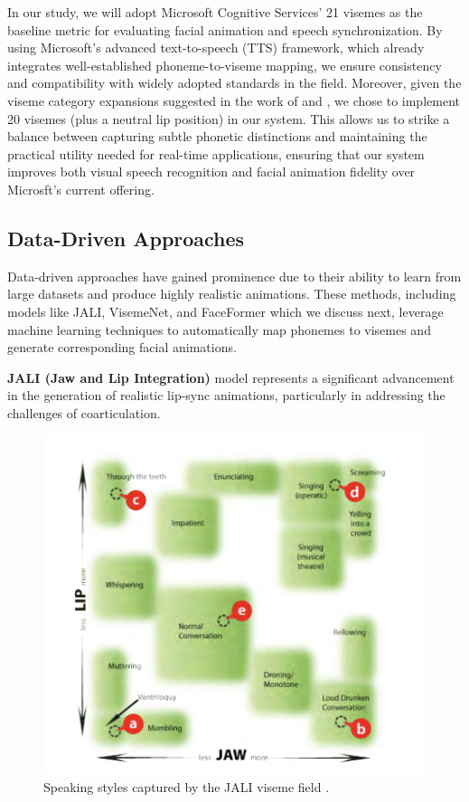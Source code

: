 \documentclass[12pt]{article}
\begin{document}
In our study, we will adopt Microsoft Cognitive Services' 21 visemes  as the baseline metric for evaluating facial animation and speech synchronization. By using Microsoft’s advanced text-to-speech (TTS) framework, which already integrates well-established phoneme-to-viseme mapping, we ensure consistency and compatibility with widely adopted standards in the field. Moreover, given the viseme category expansions suggested in the work of \cite{Xu2013AGames} and \cite{Cappelletta2012Phoneme-to-visemeRecognition}, we chose to implement 20 visemes (plus a neutral lip position) in our system. This allows us to strike a balance between capturing subtle phonetic distinctions and maintaining the practical utility needed for real-time applications, ensuring that our system improves both visual speech recognition and facial animation fidelity over Microsft's current offering.

\subsection{Data-Driven Approaches}
\label{sec:datadriven}
Data-driven approaches have gained prominence due to their ability to learn from large datasets and produce highly realistic animations. These methods,   including models like JALI, VisemeNet, and FaceFormer which we discuss next, 
leverage machine learning techniques to automatically map phonemes to visemes and generate corresponding facial animations.

{\bf JALI (Jaw and Lip Integration)} model  \cite{Edwards2016}  represents a significant advancement in the generation of realistic lip-sync animations, particularly in addressing the challenges of coarticulation.

\begin{figure}
\centering
\includegraphics[width=\linewidth]{jali.png}
\caption{Speaking styles captured by the JALI viseme field \cite{Edwards2016}.}
\label{fig:jali-viseme-field}
\end{figure}
\end{document}

